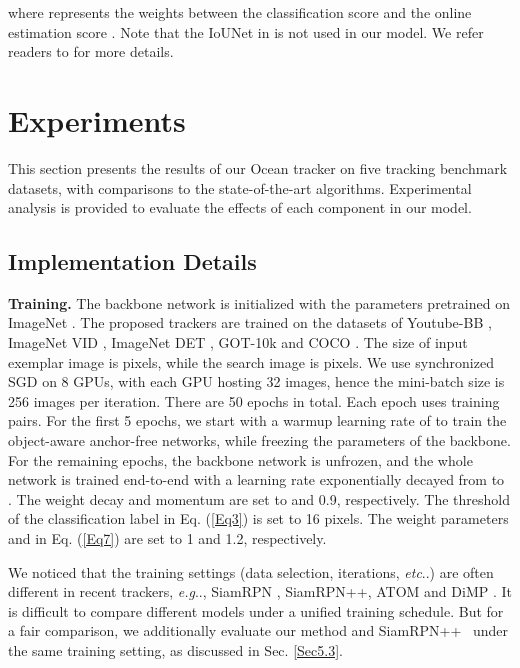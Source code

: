 \documentclass[runningheads]{llncs}
\makeatletter
\DeclareRobustCommand\onedot{\futurelet\@let@token\@onedot}
\def\@onedot{\ifx\@let@token.\else.\null\fi\xspace}
\def\eg{\emph{e.g}\onedot} \def\Eg{\emph{E.g}\onedot}
\def\etc{\emph{etc}\onedot} \def\vs{\emph{vs}\onedot}
\makeatother
\begin{document}
where  represents the weights between the classification score  and the online estimation score . Note that the IoUNet in \cite{DiMP,ATOM} is not used in our model. We refer readers to \cite{DiMP,ATOM} for more details. 





\vspace{-0.5em}
\section{Experiments}
\label{Sec5}
\vspace{-0.6em}
This section presents the results of our Ocean tracker on five tracking benchmark datasets, with comparisons to the state-of-the-art algorithms. Experimental analysis is provided to evaluate the effects of each component in our model.


\vspace{-0.5em}
\subsection{Implementation Details}


\textbf{Training.} The backbone network is initialized with the parameters pretrained on ImageNet \cite{ImageNet}. The proposed trackers are trained on the datasets of Youtube-BB \cite{YTB}, ImageNet VID \cite{ImageNet}, ImageNet DET \cite{ImageNet}, GOT-10k \cite {GOT10K} and COCO \cite{COCO}. The size of input exemplar image is  pixels, while the search image is  pixels. We use synchronized SGD \cite{SGD} on 8 GPUs, with each GPU hosting 32 images, hence the mini-batch size is 256 images per iteration. There are 50 epochs in total. Each epoch uses  training pairs. For the first 5 epochs, we start with a warmup learning rate of  to train the object-aware anchor-free networks, while freezing the parameters of the backbone. For the remaining epochs, the backbone network is unfrozen, and the whole network is trained end-to-end with a learning rate exponentially decayed from  to . The weight decay and momentum are set to  and 0.9, respectively. 
The threshold  of the classification label in Eq. (\ref{Eq3}) is set to 16 pixels. The weight parameters  and  in Eq. (\ref{Eq7}) are set to 1 and 1.2, respectively. 

We noticed that the training settings (data selection, iterations, \etc) are often different in recent trackers, \eg, SiamRPN \cite{siamRPN}, SiamRPN++\cite {SiamRPN++}, ATOM \cite{ATOM} and DiMP \cite{ATOM}. It is difficult to compare different models under a unified training schedule. But for a fair comparison, we additionally evaluate our method and SiamRPN++~\cite{SiamRPN++} under the same training setting, as discussed in Sec. \ref{Sec5.3}.
\end{document}
